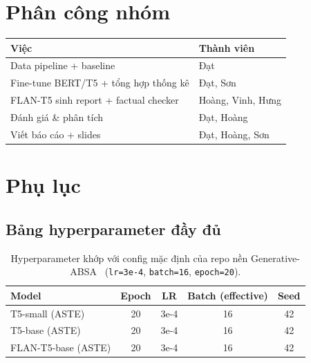 \documentclass[11pt,a4paper]{article}
\begin{document}
\clearpage
\section*{Phân công nhóm}

\begin{table}[h]
\centering
\begin{tabular}{ll}
\toprule
Việc & Thành viên \\
\midrule
Data pipeline + baseline  & Đạt \\
Fine-tune BERT/T5 + tổng hợp thống kê  & Đạt, Sơn \\
FLAN-T5 sinh report + factual checker  & Hoàng, Vinh, Hưng \\
Đánh giá \& phân tích  & Đạt, Hoàng \\
Viết báo cáo + slides  & Đạt, Hoàng, Sơn \\
\bottomrule
\end{tabular}
\end{table}


\clearpage
\appendix
\section{Phụ lục}

\subsection{Bảng hyperparameter đầy đủ}

\begin{table}[h]
\centering
\begin{tabular}{lcccc}
\toprule
Model & Epoch & LR & Batch (effective) & Seed \\
\midrule
T5-small (ASTE) & 20 & 3e-4 & 16 & 42 \\
T5-base (ASTE) & 20 & 3e-4 & 16 & 42 \\
FLAN-T5-base (ASTE) & 20 & 3e-4 & 16 & 42 \\
\bottomrule
\end{tabular}
\caption{Hyperparameter khớp với config mặc định của repo nền
Generative-ABSA~\cite{genabsa} (\texttt{lr=3e-4}, \texttt{batch=16},
\texttt{epoch=20}).}
\end{table}
\end{document}
